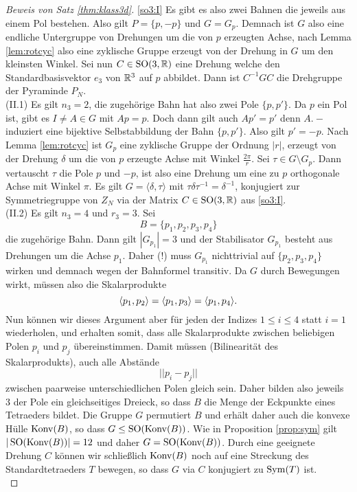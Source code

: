 \documentclass{book}
\begin{document}
\begin{proof}[Beweis von Satz \ref{thm:klass3d}]
    \noindent
    \ref{so3:I} Es gibt es also zwei Bahnen die jeweils aus einem
    Pol bestehen. Also gilt $P = \{p,-p\}$ und $G = G_p$. Demnach ist $G$ also
    eine endliche Untergruppe von Drehungen um die von $p$ erzeugten Achse,
    nach Lemma \ref{lem:rotcyc} also eine zyklische Gruppe erzeugt von der
    Drehung in $G$ um den kleinsten Winkel. Sei nun $C \in \operatorname{SO}(3,\mathbb{R})$ eine
    Drehung welche den Standardbasisvektor $e_3$ von $\mathbb{R}^3$ auf $p$ abbildet.
    Dann ist $C^{-1} G C$ die Drehgruppe der Pyraminde $P_N$.\\ 

    \noindent
    (II.1) Es gilt $n_3 = 2$, die zugehörige Bahn hat also zwei Pole
    $\{p,p'\}$. Da $p$ ein Pol ist, gibt es $I \ne A \in G$ mit $Ap = p$. Doch
    dann gilt auch $Ap' = p'$ denn $A.-$ induziert eine bijektive
    Selbstabbildung der Bahn $\{p,p'\}$. Also gilt $p' = -p$. Nach Lemma
    \ref{lem:rotcyc} ist $G_p$ eine zyklische Gruppe der Ordnung $|r|$,
    erzeugt von der Drehung $\delta$ um die von $p$ erzeugte Achse mit Winkel
    $\frac{2 \pi}{r}$. Sei $\tau \in G \setminus G_p$. Dann vertauscht $\tau$
    die Pole $p$ und $-p$, ist also eine Drehung um eine zu $p$ orthogonale
    Achse mit Winkel $\pi$. Es gilt $G = \langle \delta, \tau \rangle$ mit
    $\tau \delta \tau^{-1} = \delta^{-1}$, konjugiert zur Symmetriegruppe von
    $Z_N$ via der Matrix $C \in \operatorname{SO}(3,\mathbb{R})$ aus \ref{so3:I}.\\  

    \noindent
    (II.2) Es gilt $n_3 = 4$ und $r_3 = 3$. Sei
    \[
        B = \{p_1, p_2, p_3, p_4\}
    \]
    die zugehörige Bahn. Dann gilt $|G_{p_1}| = 3$
    und der Stabilisator $G_{p_1}$ besteht aus Drehungen um die Achse $p_1$.
    Daher (!) muss $G_{p_1}$ nichttrivial auf $\{p_2,p_3,p_4\}$ wirken und
    demnach wegen der Bahnformel transitiv. Da $G$ durch Bewegungen wirkt,
    müssen also die Skalarprodukte
    \[
        \langle p_1, p_2 \rangle = \langle p_1, p_3 \rangle = \langle p_1, p_4 \rangle.
    \]
    Nun können wir dieses Argument aber für jeden der Indizes $1 \le i \le 4$
    statt $i = 1$ wiederholen, und erhalten somit, dass alle Skalarprodukte
    zwischen beliebigen Polen $p_i$ und $p_j$ übereinstimmen. Damit müssen
    (Bilinearität des Skalarprodukts), auch alle Abstände
    \[
        || p_i - p_j ||
    \]
    zwischen paarweise unterschiedlichen Polen gleich sein. Daher bilden also
    jeweils $3$ der Pole ein gleichseitiges Dreieck, so dass $B$ die Menge
    der Eckpunkte eines Tetraeders bildet. Die Gruppe $G$ permutiert $B$ und
    erhält daher auch die konvexe Hülle $\operatorname{Konv}(B)$, so dass $G \le
    \operatorname{SO}(\operatorname{Konv}(B))$. Wie in Proposition \ref{prop:sym} gilt $|\operatorname{SO}(\operatorname{Konv}(B))| =
    12$ und daher $G = \operatorname{SO}(\operatorname{Konv}(B))$. Durch eine geeignete Drehung $C$ können wir
    schließlich $\operatorname{Konv}(B)$ noch auf eine Streckung des Standardtetraeders $T$ bewegen, so
    dass $G$ via $C$ konjugiert zu $\operatorname{Sym}(T)$ ist.\\ 


\end{proof}
\end{document}
